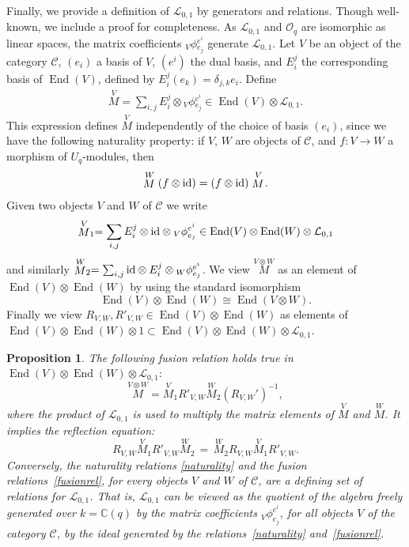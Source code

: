 \documentclass[pdftex]{sigma}%
\numberwithin{equation}{section}
\numberwithin{figure}{section}
\newtheorem{prop}[teo]{Proposition}
\newcommand{\Oq}{\Oo_{q}}
\newcommand{\mc}{\mathbb{C}}
\newcommand{\Ll}{{\mathcal L}}
\newcommand{\Oo}{{\mathcal O}}
\begin{document}
Finally, we provide a definition of $\Ll_{0,1}$ by generators and relations. Though well-known, we include a proof for completeness. As $\Ll_{0,1}$ and $\Oq$ are isomorphic as linear spaces, the matrix coefficients ${}_V\phi{}^{e^i}_{e_j}$ generate $\Ll_{0,1}$. Let $V$ be an object of the category ${\mathcal C}$, $(e_i)$ a basis of $V$, $(e^i)$ the dual basis, and $E_i^j$ the corresponding basis of $\operatorname{End}(V)$, defined by $E_i^j (e_k)=\delta_{j,k}e_i$. Define
\begin{gather}\label{matdef}
\stackrel{V}{M}=\sum_{i,j }E_i^j\otimes {}_V\phi{}^{e^i}_{e_j} \in \operatorname{End}(V)\otimes \Ll_{0,1}.
\end{gather}
This expression defines $\stackrel{V}{M}$ independently of the choice of basis $(e_i)$, since we have the following naturality property: if $V$, $W$ are objects of ${\mathcal C}$, and $f\colon V\to W$ a morphism of $U_q$-modules, then
\begin{gather}\label{naturality}
\stackrel{W}{M} (f\otimes {\rm id})=(f\otimes {\rm id})\stackrel{V}{M} \!.
\end{gather}
Given two objects $V$ and $W$ of $\mathcal{C}$ we write
\[
\stackrel{V}{M}_1 = \sum_{i,j }E_i^j\otimes {\rm id} \otimes {}_V\phi{}^{e^i}_{e_j} \in \operatorname{End}(V)\otimes \operatorname{End}(W) \otimes \Ll_{0,1}
\]
and similarly $ \stackrel{W}{M}_2 = \sum_{i,j }{\rm id} \otimes E_i^j\otimes {}_W\phi{}^{e^i}_{e_j}$. We view $\stackrel{V\otimes W}{M}$ as an element of $\operatorname{End}(V)\otimes \operatorname{End}(W)$ by using the standard isomorphism
\[
\operatorname{End}(V)\otimes \operatorname{End}(W)\cong \operatorname{End}(V\otimes W).
\]
Finally we view ${R}_{V,W}, {R'}_{V,W}\in \operatorname{End}(V)\otimes \operatorname{End}(W)$ as elements of $\operatorname{End}(V)\otimes \operatorname{End}(W)\otimes 1 \subset \operatorname{End}(V)\otimes \operatorname{End}(W)\otimes \Ll_{0,1}$.

\begin{prop}\label{fusrel} The following fusion relation holds true in $\operatorname{End}(V)\otimes \operatorname{End}(W) \otimes \Ll_{0,1}{:}$
\begin{equation}\label{fusionrel}
\stackrel{V\otimes W}{M}=\stackrel{V}{M}_1 {R'}_{V,W}\stackrel{W}{M}_2(R_{V,W}')^{-1},
\end{equation}
where the product of $\Ll_{0,1}$ is used to multiply the matrix elements of $\stackrel{V}{M}$ and $\stackrel{W}{M}$. It implies the reflection equation:
\begin{equation}\label{reflexrel}
{R}_{V,W}\stackrel{V}{M}_1 {R'}_{V,W}\stackrel{W}{M}_2\, =\, \stackrel{W}{M}_2 {R}_{V,W}\stackrel{V}{M}_1{R'}_{V,W}.
\end{equation}
Conversely, the naturality relations \eqref{naturality} and the fusion relations~\eqref{fusionrel}, for every objects $V$ and $W$ of $\mathcal{C}$, are a defining set of relations for $\Ll_{0,1}$. That is, $\Ll_{0,1}$ can be viewed as the quotient of the algebra freely generated over $k=\mc(q)$ by the matrix coefficients ${}_V\phi^{e^i}_{e_j}$, for all objects $V$ of the category $\mathcal{C}$, by the ideal generated by the relations~\eqref{naturality} and~\eqref{fusionrel}.
\end{prop}
\end{document}
